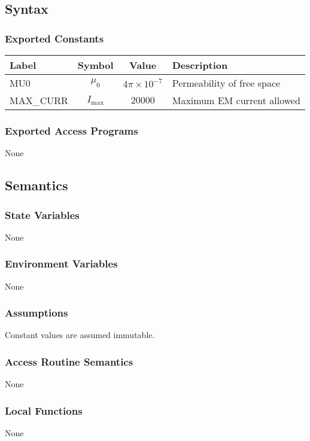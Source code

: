 \documentclass[12pt, titlepage]{article}
\begin{document}
\subsection{Syntax}
\subsubsection{Exported Constants}
\begin{center}
  \begin{tabular}{ >{\raggedright\arraybackslash}p{4cm} | c | c | p{6cm} }
    \textbf{Label} & \textbf{Symbol} & \textbf{Value} & \textbf{Description} \\
    \hline
    MU0 & $\mu_0$ & $4\pi\times10^{-7}$ & Permeability of free space \\
    \hline
    MAX\_CURR & $I_{\max}$ & $20000$ & Maximum EM current allowed
  \end{tabular}
  \end{center}

\subsubsection{Exported Access Programs}
None 

\subsection{Semantics}

\subsubsection{State Variables}
None

\subsubsection{Environment Variables}
None

\subsubsection{Assumptions}
Constant values are assumed immutable. 

\subsubsection{Access Routine Semantics}
None

\subsubsection{Local Functions}
None
\end{document}
